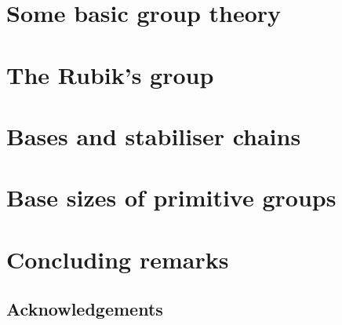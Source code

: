 \documentclass[handout]{beamer}
\begin{document}
\section{Some basic group theory}



\section{The Rubik's group}



\section{Bases and stabiliser chains}



\section{Base sizes of primitive groups}



\section{Concluding remarks}

\subsection{Acknowledgements}
\end{document}
